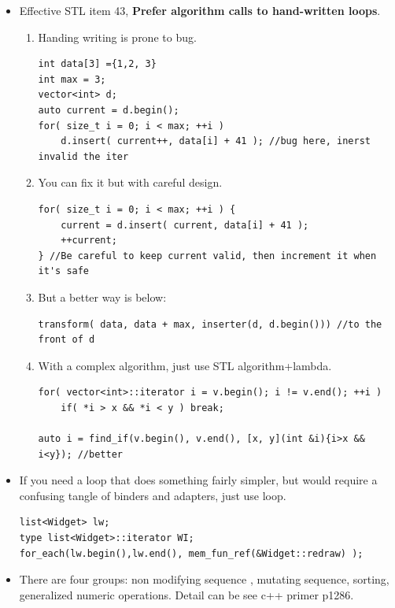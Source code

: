 \documentclass[a4paper,11pt,twoside]{book}
\begin{document}
\begin{itemize}

\item Effective STL item 43, \textbf{Prefer algorithm calls to hand-written loops}.
\begin{enumerate}
	
	\item  Handing writing is prone to bug.
\begin{lstlisting}
int data[3] ={1,2, 3}
int max = 3;
vector<int> d;
auto current = d.begin();
for( size_t i = 0; i < max; ++i )
	d.insert( current++, data[i] + 41 ); //bug here, inerst invalid the iter
\end{lstlisting}

	\item You can fix it but with careful design.
\begin{lstlisting}
for( size_t i = 0; i < max; ++i ) {
	current = d.insert( current, data[i] + 41 ); 
	++current;    
} //Be careful to keep current valid, then increment it when it's safe
\end{lstlisting}

	\item But a better way is below:
\begin{lstlisting}[numbers=none]
transform( data, data + max, inserter(d, d.begin())) //to the front of d
\end{lstlisting}

	\item With a complex algorithm, just use STL algorithm+lambda. 
\begin{lstlisting}[numbers=none]
for( vector<int>::iterator i = v.begin(); i != v.end(); ++i )
	if( *i > x && *i < y ) break;

auto i = find_if(v.begin(), v.end(), [x, y](int &i){i>x && i<y}); //better
\end{lstlisting}
\end{enumerate}

	\item If you need a loop that does something fairly simpler, but would require a confusing tangle of binders and adapters, just use loop.
\begin{lstlisting}[numbers=none]
list<Widget> lw;
type list<Widget>::iterator WI;
for_each(lw.begin(),lw.end(), mem_fun_ref(&Widget::redraw) );
\end{lstlisting}

	\item There are four groups: non modifying sequence , mutating sequence, sorting, generalized numeric operations. Detail can be see c++ primer p1286.


\end{itemize}
\end{document}
